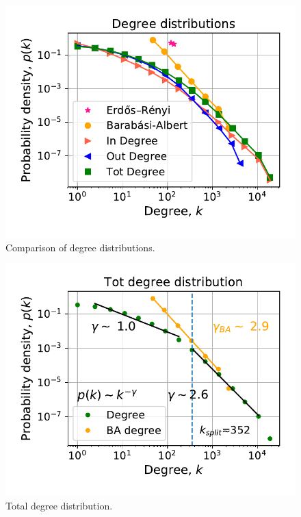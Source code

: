 \documentclass[11pt, twoside]{report}
\begin{document}
\begin{minipage}[b]{0.5\textwidth}
   \centering
    \begin{figure}[H]
      \includegraphics[width=\textwidth]{../../scripts/network_analysis/imgs/degree_distributions.pdf}            
          \caption{Comparison of degree distributions.}
        \label{fig:degree_comparison}
\end{figure}
\end{minipage}
\begin{minipage}[b]{0.5\textwidth}
  \begin{figure}[H]
  \centering
  \includegraphics[width=\textwidth]{../../scripts/network_analysis/imgs/tot_degree_distribution.pdf}            
        \caption{Total degree distribution.}
\label{fig:tot_degree}
\end{figure}
\end{minipage}
    
\end{document}
